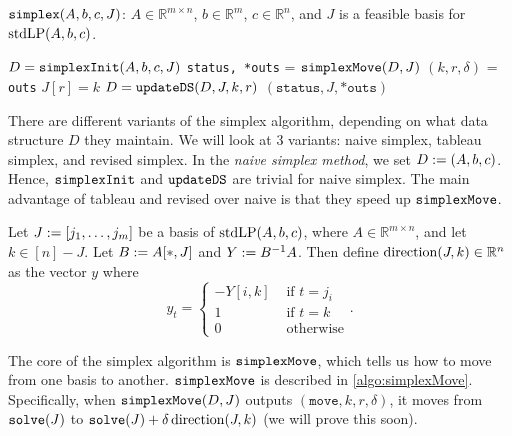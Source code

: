 \begin{algorithm}[H]
\caption{$\operatorname{\mathtt{simplex}}(A, b, c, J)$:
$A \in \mathbb{R}^{m \times n}$, $b \in \mathbb{R}^m$, $c \in \mathbb{R}^n$,
and $J$ is a feasible basis for $\operatorname{stdLP}(A, b, c)$.
}
\begin{algorithmic}[1]
\State $D = \operatorname{\mathtt{simplexInit}}(A, b, c, J)$
    \State \texttt{status, *outs} = $\operatorname{\mathtt{simplexMove}}(D, J)$
        \State $(k, r, \delta)$ = \texttt{outs}
        \State\label{alg-line:simplex:J}$J[r] = k$
        \State $D = \operatorname{\mathtt{updateDS}}(D, J, k, r)$
    \Else
        \State \Return $(\texttt{status}, J, \texttt{*outs})$
    \EndIf
\EndWhile
\end{algorithmic}
\label{algo:simplex}
\end{algorithm}

There are different variants of the simplex algorithm, depending on what
data structure $D$ they maintain.
We will look at 3 variants: naive simplex, tableau simplex, and revised simplex.
In the \emph{naive simplex method}, we set $D := (A, b, c)$.
Hence, $\operatorname{\mathtt{simplexInit}}$ and $\operatorname{\mathtt{updateDS}}$ are trivial for naive simplex.
The main advantage of tableau and revised over naive is that they speed up $\operatorname{\mathtt{simplexMove}}$.

\begin{definition}
Let $J := [j_1, \ldots, j_m]$ be a basis of $\operatorname{stdLP}(A, b, c)$,
where $A \in \mathbb{R}^{m \times n}$, and let $k \in [n] - J$.
Let $B := A[*,J]$ and $Y := B^{-1}A$.
Then define $\operatorname{direction}(J, k) \in \mathbb{R}^n$ as the vector $y$ where
\[ y_t = \begin{cases}
    -Y[i, k] & \textrm{ if } t = j_i
    \\ 1 & \textrm{ if } t = k
    \\ 0 & \textrm{ otherwise}
    \end{cases}. \]
\end{definition}

The core of the simplex algorithm is $\operatorname{\mathtt{simplexMove}}$,
which tells us how to move from one basis to another.
$\operatorname{\mathtt{simplexMove}}$ is described in \cref{algo:simplexMove}.
Specifically, when $\operatorname{\mathtt{simplexMove}}(D, J)$ outputs $(\mathtt{move}, k, r, \delta)$,
it moves from $\operatorname{\mathtt{solve}}(J)$ to $\operatorname{\mathtt{solve}}(J) + \delta\operatorname{direction}(J, k)$ (we will prove this soon).

